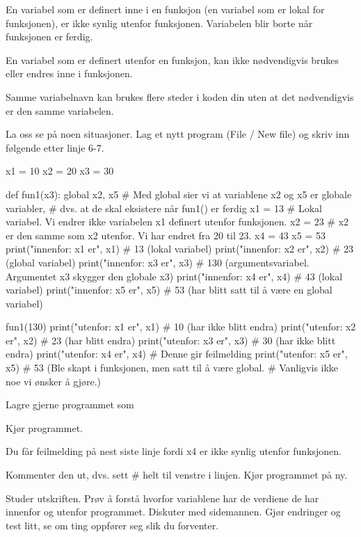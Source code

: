 {En variabel som er definert inne i en funksjon (en variabel som er lokal for funksjonen), er ikke synlig utenfor funksjonen. Variabelen blir borte når funksjonen er ferdig. 

En variabel som er definert utenfor en funksjon, kan ikke nødvendigvis brukes eller endres inne i funksjonen. 

Samme variabelnavn kan brukes flere steder i koden din uten at det nødvendigvis er den samme variabelen.

La oss se på noen situasjoner. Lag et nytt program (File / New file) og skriv inn følgende etter linje 6-7.

\begin{usncodebox}
x1 = 10
x2 = 20
x3 = 30

def fun1(x3):
    global x2, x5   # Med global sier vi at variablene x2 og x5 er globale variabler,  
                    # dvs. at de skal eksistere når fun1() er ferdig
    x1 = 13   # Lokal variabel. Vi endrer ikke variabelen x1 definert utenfor funksjonen. 
    x2 = 23   # x2 er den samme som x2 utenfor. Vi har endret fra 20 til 23. 
    x4 = 43
    x5 = 53
    print("innenfor: x1 er", x1)  #  13 (lokal variabel)
    print("innenfor: x2 er", x2)  #  23 (global variabel)
    print("innenfor: x3 er", x3)  # 130 (argumentsvariabel. Argumentet x3 skygger den globale x3)
    print("innenfor: x4 er", x4)  #  43 (lokal variabel)
    print("innenfor: x5 er", x5)  #  53 (har blitt satt til å være en global variabel)

fun1(130)
print("utenfor: x1 er", x1)   # 10 (har ikke blitt endra)
print("utenfor: x2 er", x2)   # 23 (har blitt endra)
print("utenfor: x3 er", x3)   # 30 (har ikke blitt endra)
print("utenfor: x4 er", x4)   # Denne gir feilmelding 
print("utenfor: x5 er", x5)   # 53 (Ble skapt i funksjonen, men satt til å være global. 
                              # Vanligvis ikke noe vi ønsker å gjøre.) 

\end{usncodebox}

Lagre gjerne programmet som 

Kjør programmet.

Du får feilmelding på nest siste linje fordi x4 er ikke synlig utenfor funksjonen. 

Kommenter den ut, dvs. sett \# helt til venstre i linjen. Kjør programmet på ny.

Studer utskriften. Prøv å forstå hvorfor variablene har de verdiene de har innenfor og utenfor programmet. Diskuter med sidemannen. Gjør endringer og test litt, se om ting oppfører seg slik du forventer.

}

